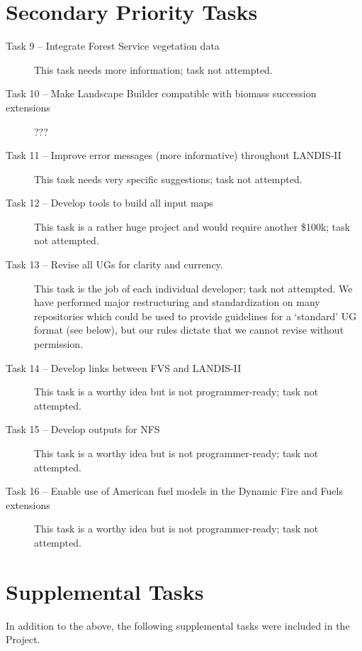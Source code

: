 \documentclass[letterpaper,11pt]{texMemo}
\begin{document}
\section*{Secondary Priority Tasks}
\begin{description}
  \item[Task 9 -- Integrate Forest Service vegetation data] This task needs more information; task not attempted.
  \item[Task 10 -- Make Landscape Builder compatible with biomass succession extensions] ???
  \item[Task 11 -- Improve error messages (more informative) throughout LANDIS-II] This task needs very specific suggestions; task not attempted.
  \item[Task 12 -- Develop tools to build all input maps] This task is a rather huge project and would require another \$100k; task not attempted.
  \item[Task 13 -- Revise all UGs for clarity and currency.] This task is the job of each individual developer; task not attempted. We have performed major restructuring and standardization on many repositories which could be used to provide guidelines for a ‘standard’ UG format (see below), but our rules dictate that we cannot revise without permission.
  \item[Task 14 -- Develop links between FVS and LANDIS-II ] This task is a worthy idea but is not programmer-ready; task not attempted.
  \item[Task 15 -- Develop outputs for NFS] This task is a worthy idea but is not programmer-ready; task not attempted.
  \item[Task 16 -- Enable use of American fuel models in the Dynamic Fire and Fuels extensions] This task is a worthy idea but is not programmer-ready; task not attempted.
\end{description}

\section*{Supplemental Tasks}
In addition to the above, the following supplemental tasks were included in the Project.
\end{document}
